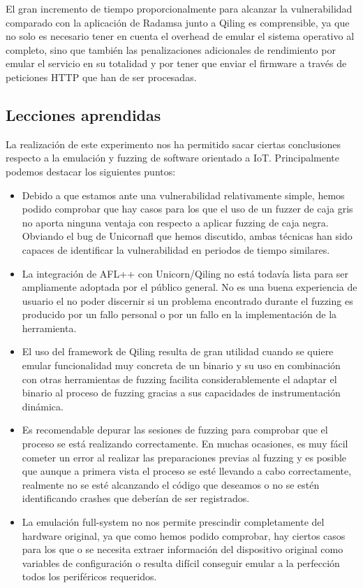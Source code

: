 El gran incremento de tiempo proporcionalmente para alcanzar la vulnerabilidad comparado con la aplicación de Radamsa junto a Qiling es comprensible, ya que 
no solo es necesario tener en cuenta el overhead de emular el sistema operativo al completo, sino que también las penalizaciones adicionales 
de rendimiento por emular el servicio en su totalidad y por tener que enviar el firmware a través de peticiones HTTP que han de ser procesadas.

\subsection{Lecciones aprendidas}
La realización de este experimento nos ha permitido sacar ciertas conclusiones respecto a la emulación y fuzzing de software orientado a IoT.
Principalmente podemos destacar los siguientes puntos:
\begin{itemize}
    \item Debido a que estamos ante una vulnerabilidad relativamente simple, hemos podido comprobar que hay casos para los que el uso de un 
    fuzzer de caja gris no aporta ninguna ventaja con respecto a aplicar fuzzing de caja negra. Obviando el bug de Unicornafl que hemos
    discutido, ambas técnicas han sido capaces de identificar la vulnerabilidad en periodos de tiempo similares.
    \item La integración de AFL++ con Unicorn/Qiling no está todavía lista para ser ampliamente adoptada por el público general. No es una 
    buena experiencia de usuario el no poder discernir si un problema encontrado durante el fuzzing es producido por un fallo personal 
    o por un fallo en la implementación de la herramienta.
    \item El uso del framework de Qiling resulta de gran utilidad cuando se quiere emular funcionalidad muy concreta de un binario y su 
    uso en combinación con otras herramientas de fuzzing facilita considerablemente el adaptar el binario al proceso de fuzzing gracias a 
    sus capacidades de instrumentación dinámica.
    \item Es recomendable depurar las sesiones de fuzzing para comprobar que el proceso se está realizando correctamente. En muchas ocasiones,
    es muy fácil cometer un error al realizar las preparaciones previas al fuzzing y es posible que aunque a primera vista el proceso se esté 
    llevando a cabo correctamente, realmente no se esté alcanzando el código que deseamos o no se estén identificando crashes que deberían de 
    ser registrados.
    \item La emulación full-system no nos permite prescindir completamente del hardware original, ya que como hemos podido comprobar, hay ciertos 
    casos para los que o se necesita extraer información del dispositivo original como variables de configuración o resulta difícil conseguir 
    emular a la perfección todos los periféricos requeridos.
\end{itemize}

